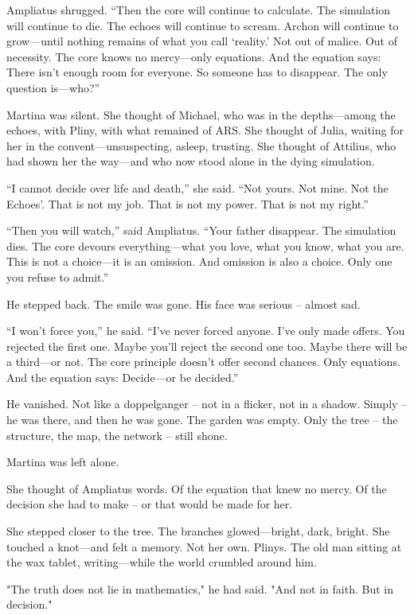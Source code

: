 \documentclass[
]{article}
\begin{document}
Ampliatus shrugged. ``Then the core will continue to calculate. The simulation will continue to die. The echoes will continue to scream. Archon will continue to grow---until nothing remains of what you call `reality.' Not out of malice. Out of necessity. The core knows no mercy---only equations. And the equation says: There isn't enough room for everyone. So someone has to disappear. The only question is---who?''

Martina was silent. She thought of Michael, who was in the depths---among the echoes, with Pliny, with what remained of ARS. She thought of Julia, waiting for her in the convent---unsuspecting, asleep, trusting. She thought of Attilius, who had shown her the way---and who now stood alone in the dying simulation.

``I cannot decide over life and death,'' she said. ``Not yours. Not mine. Not the Echoes'. That is not my job. That is not my power. That is not my right.''

``Then you will watch,'' said Ampliatus. ``Your father disappear. The simulation dies. The core devours everything---what you love, what you know, what you are. This is not a choice---it is an omission. And omission is also a choice. Only one you refuse to admit.''

He stepped back. The smile was gone. His face was serious -- almost sad.

``I won't force you,'' he said. ``I've never forced anyone. I've only made offers. You rejected the first one. Maybe you'll reject the second one too. Maybe there will be a third---or not. The core principle doesn't offer second chances. Only equations. And the equation says: Decide---or be decided.''

He vanished. Not like a doppelganger -- not in a flicker, not in a shadow. Simply -- he was there, and then he was gone. The garden was empty. Only the tree -- the structure, the map, the network -- still shone.

Martina was left alone.

She thought of Ampliatus\textquotesingle{} words. Of the equation that knew no mercy. Of the decision she had to make -- or that would be made for her.

She stepped closer to the tree. The branches glowed---bright, dark, bright. She touched a knot---and felt a memory. Not her own. Pliny\textquotesingle s. The old man sitting at the wax tablet, writing---while the world crumbled around him.

"The truth does not lie in mathematics," he had said. "And not in faith. But in decision."
\end{document}
